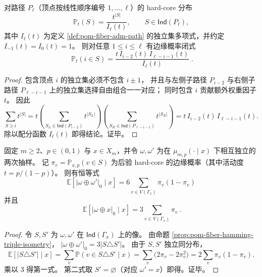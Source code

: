\begin{proposition}\label{prop:pom-hardcore-path-marginal-closed-form}
对路径 \(P_\ell\)（顶点按线性顺序编号 \(1,\dots,\ell\)）的 hard-core 分布
\[
\mathbb P_t(S)=\frac{t^{|S|}}{I_\ell(t)},\qquad S\in \mathsf{Ind}(P_\ell),
\]
其中 \(I_\ell(t)\) 为定义 \ref{def:pom-fiber-adm-path} 的独立集多项式，并约定 \(I_{-1}(t)=I_0(t)=1\)。
则对任意 \(1\le i\le \ell\) 有边缘概率闭式
\[
\boxed{\;
\mathbb P_t(i\in S)
=\frac{t\,I_{i-2}(t)\,I_{\ell-i-1}(t)}{I_\ell(t)}\; }.
\]
\end{proposition}
\begin{proof}
包含顶点 \(i\) 的独立集必须不包含 \(i\pm 1\)，
并且与左侧子路径 \(P_{i-2}\) 与右侧子路径 \(P_{\ell-i-1}\) 上的独立集选择自由组合一一对应；
同时包含 \(i\) 贡献额外权重因子 \(t\)。
因此
\[
\sum_{S\ni i} t^{|S|}
=t\left(\sum_{S_L\in\mathsf{Ind}(P_{i-2})}t^{|S_L|}\right)\left(\sum_{S_R\in\mathsf{Ind}(P_{\ell-i-1})}t^{|S_R|}\right)
=t\,I_{i-2}(t)\,I_{\ell-i-1}(t).
\]
除以配分函数 \(I_\ell(t)\) 即得结论。证毕。
\end{proof}

\begin{corollary}[后验两次抽样的条件汉明多样性泛函]\label{cor:pom-fiber-posterior-hamming-diversity}
固定 \(m\ge 2\)、\(p\in(0,1)\) 与 \(x\in X_m\)，并令 \(\omega,\omega'\) 为在 \(\mu_{m,p}(\cdot\mid x)\) 下相互独立的两次抽样。
记 \(\pi_v=\mathbb P_{x,p}(v\in S)\) 为后验 hard-core 的边缘概率（其中活动度 \(t=p/(1-p)\)）。
则有恒等式
\[
\boxed{\;
\mathbb E\!\left[|\omega\oplus\omega'|_0\mid x\right]
=6\sum_{v\in V(\Gamma_x)}\pi_v(1-\pi_v)\;}
\]
并且
\[
\boxed{\;
\mathbb E\!\left[|\omega\oplus x|_0\mid x\right]
=3\sum_{v\in V(\Gamma_x)}\pi_v\; }.
\]
\end{corollary}
\begin{proof}
令 \(S,S'\) 为 \(\omega,\omega'\) 在 \(\mathsf{Ind}(\Gamma_x)\) 上的像。
由命题 \ref{prop:pom-fiber-hamming-triple-isometry}，
\(
|\omega\oplus\omega'|_0=3|S\triangle S'|
\)。
由于 \(S,S'\) 独立同分布，
\[
\mathbb E[|S\triangle S'|\mid x]
=\sum_v \mathbb P(v\in S\triangle S'\mid x)
=\sum_v \bigl(2\pi_v-2\pi_v^2\bigr)
=2\sum_v \pi_v(1-\pi_v).
\]
乘以 \(3\) 得第一式。
第二式取 \(S'=\varnothing\)（对应 \(\omega'=x\)）即得。证毕。
\end{proof}

